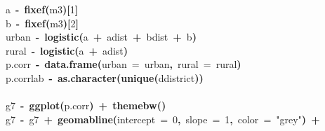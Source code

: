 \documentclass{article}
\makeatletter
\newcommand{\hlnumber}[1]{\textcolor[rgb]{0,0,0}{#1}}%
\newcommand{\hlfunctioncall}[1]{\textcolor[rgb]{.5,0,.33}{\textbf{#1}}}%
\newcommand{\hlstring}[1]{\textcolor[rgb]{.6,.6,1}{#1}}%
\newcommand{\hlkeyword}[1]{\textbf{#1}}%
\newcommand{\hlargument}[1]{\textcolor[rgb]{.69,.25,.02}{#1}}%
\newcommand{\hlassignement}[1]{\textbf{#1}}%
\newcommand{\hlsymbol}[1]{#1}%
\newcommand{\hlstd}[1]{\textcolor[rgb]{0,0,0}{#1}}%
\newenvironment{kframe}{%
 \def\FrameCommand##1{\hskip\@totalleftmargin \hskip-\fboxsep
 \colorbox{shadecolor}{##1}\hskip-\fboxsep
     \hskip-\linewidth \hskip-\@totalleftmargin \hskip\columnwidth}%
 \MakeFramed {\advance\hsize-\width
   \@totalleftmargin\z@ \linewidth\hsize
   \@setminipage}}%
 {\par\unskip\endMakeFramed}
\newenvironment{knitrout}{}{} %
\makeatother
\begin{document}
\begin{knitrout}
{\begin{kframe}
\begin{flushleft}
\hlstd{}\hlsymbol{a}{\ }\hlassignement{\usebox{\hlnormalsizeboxlessthan}-}{\ }\hlfunctioncall{fixef}\hlkeyword{(}\hlsymbol{m3}\hlkeyword{)}\hlkeyword{[}\hlnumber{1}\hlkeyword{]}\hspace*{\fill}\\
\hlstd{}\hlsymbol{b}{\ }\hlassignement{\usebox{\hlnormalsizeboxlessthan}-}{\ }\hlfunctioncall{fixef}\hlkeyword{(}\hlsymbol{m3}\hlkeyword{)}\hlkeyword{[}\hlnumber{2}\hlkeyword{]}\hspace*{\fill}\\
\hlstd{}\hlsymbol{urban}{\ }\hlassignement{\usebox{\hlnormalsizeboxlessthan}-}{\ }\hlfunctioncall{logistic}\hlkeyword{(}\hlsymbol{a}{\ }\hlkeyword{+}{\ }\hlsymbol{a\usebox{\hlnormalsizeboxunderscore}dist}{\ }\hlkeyword{+}{\ }\hlsymbol{b\usebox{\hlnormalsizeboxunderscore}dist}{\ }\hlkeyword{+}{\ }\hlsymbol{b}\hlkeyword{)}\hspace*{\fill}\\
\hlstd{}\hlsymbol{rural}{\ }\hlassignement{\usebox{\hlnormalsizeboxlessthan}-}{\ }\hlfunctioncall{logistic}\hlkeyword{(}\hlsymbol{a}{\ }\hlkeyword{+}{\ }\hlsymbol{a\usebox{\hlnormalsizeboxunderscore}dist}\hlkeyword{)}\hspace*{\fill}\\
\hlstd{}\hlsymbol{p.corr}{\ }\hlassignement{\usebox{\hlnormalsizeboxlessthan}-}{\ }\hlfunctioncall{data.frame}\hlkeyword{(}\hlargument{urban}{\ }\hlargument{=}{\ }\hlsymbol{urban}\hlkeyword{,}{\ }\hlargument{rural}{\ }\hlargument{=}{\ }\hlsymbol{rural}\hlkeyword{)}\hspace*{\fill}\\
\hlstd{}\hlsymbol{p.corr}\hlkeyword{\usebox{\hlnormalsizeboxdollar}}\hlsymbol{lab}{\ }\hlassignement{\usebox{\hlnormalsizeboxlessthan}-}{\ }\hlfunctioncall{as.character}\hlkeyword{(}\hlfunctioncall{unique}\hlkeyword{(}\hlsymbol{d}\hlkeyword{\usebox{\hlnormalsizeboxdollar}}\hlsymbol{district}\hlkeyword{)}\hlkeyword{)}\hspace*{\fill}\\
\hlstd{}\hspace*{\fill}\\
\hlstd{}\hlsymbol{g7}{\ }\hlassignement{\usebox{\hlnormalsizeboxlessthan}-}{\ }\hlfunctioncall{ggplot}\hlkeyword{(}\hlsymbol{p.corr}\hlkeyword{)}{\ }\hlkeyword{+}{\ }\hlfunctioncall{theme\usebox{\hlnormalsizeboxunderscore}bw}\hlkeyword{(}\hlkeyword{)}\hspace*{\fill}\\
\hlstd{}\hlsymbol{g7}{\ }\hlassignement{\usebox{\hlnormalsizeboxlessthan}-}{\ }\hlsymbol{g7}{\ }\hlkeyword{+}{\ }\hlfunctioncall{geom\usebox{\hlnormalsizeboxunderscore}abline}\hlkeyword{(}\hlargument{intercept}{\ }\hlargument{=}{\ }\hlnumber{0}\hlkeyword{,}{\ }\hlargument{slope}{\ }\hlargument{=}{\ }\hlnumber{1}\hlkeyword{,}{\ }\hlargument{color}{\ }\hlargument{=}{\ }\hlstring{"{}grey"{}}\hlkeyword{)}{\ }\hlkeyword{+}\hspace*{\fill}\\

\end{flushleft}
\end{kframe}}
\end{knitrout}
\end{document}
